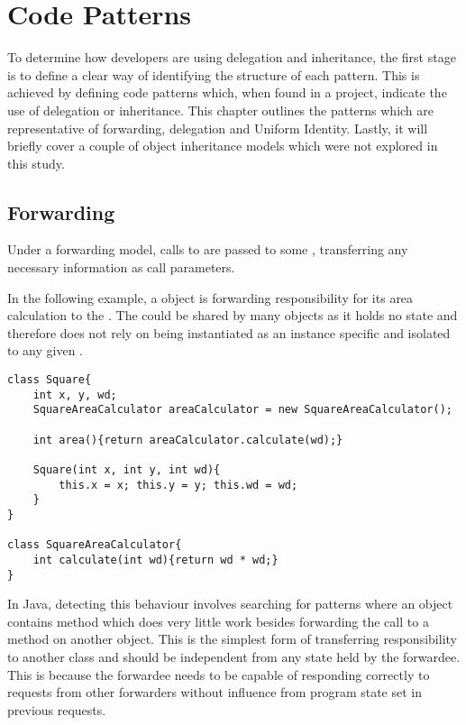 \chapter{Code Patterns}\label{C:bg}
To determine how developers are using delegation and inheritance, the first stage is to define a clear way of identifying the structure of each pattern. This is achieved by defining code patterns which, when found in a project, indicate the use of delegation or inheritance. This chapter outlines the patterns which are representative of forwarding, delegation and Uniform Identity. Lastly, it will briefly cover a couple of object inheritance models which were not explored in this study.

\section{Forwarding}
\label{sec:forwarding}
Under a forwarding model, calls to  are passed to some , transferring any necessary information as call parameters.
\newline

In the following example, a  object is forwarding responsibility for its area calculation to the . The  could be shared by many  objects as it holds no state and therefore does not rely on being instantiated as an instance specific and isolated to any given .

\begin{lstlisting}
class Square{
	int x, y, wd;
	SquareAreaCalculator areaCalculator = new SquareAreaCalculator();

	int area(){return areaCalculator.calculate(wd);}

	Square(int x, int y, int wd){
		this.x = x; this.y = y; this.wd = wd;
	}
}

class SquareAreaCalculator{
	int calculate(int wd){return wd * wd;}
}
\end{lstlisting}

In Java, detecting this behaviour involves searching for patterns where an object contains method which does very little work besides forwarding the call to a method on another object. This is the simplest form of transferring responsibility to another class and should be independent from any state held by the forwardee. This is because the forwardee needs to be capable of responding correctly to requests from other forwarders without influence from program state set in previous requests.
\newline

